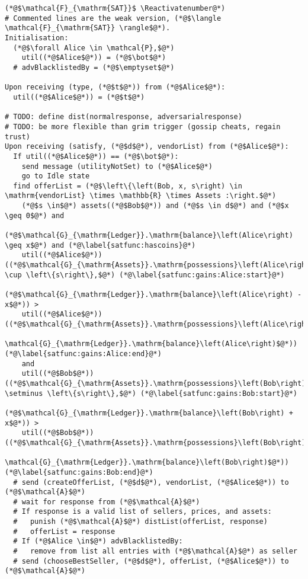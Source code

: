 \Suppressnumber
\begin{lstlisting}[label=satfunc, style=numbers]
(*@$\mathcal{F}_{\mathrm{SAT}}$ \Reactivatenumber@*)
# Commented lines are the weak version, (*@$\langle \mathcal{F}_{\mathrm{SAT}} \rangle$@*).
Initialisation:
  (*@$\forall Alice \in \mathcal{P},$@*)
    util((*@$Alice$@*)) = (*@$\bot$@*)
  # advBlacklistedBy = (*@$\emptyset$@*)

Upon receiving (type, (*@$t$@*)) from (*@$Alice$@*):
  util((*@$Alice$@*)) = (*@$t$@*)

# TODO: define dist(normalresponse, adversarialresponse)
# TODO: be more flexible than grim trigger (gossip cheats, regain trust)
Upon receiving (satisfy, (*@$d$@*), vendorList) from (*@$Alice$@*):
  If util((*@$Alice$@*)) == (*@$\bot$@*):
    send message (utilityNotSet) to (*@$Alice$@*)
    go to Idle state
  find offerList = (*@$\left\{\left(Bob, x, s\right) \in \mathrm{vendorList} \times \mathbb{R} \times Assets :\right.$@*)
    (*@$s \in$@*) assets((*@$Bob$@*)) and (*@$s \in d$@*) and (*@$x \geq 0$@*) and
    (*@$\mathcal{G}_{\mathrm{Ledger}}.\mathrm{balance}\left(Alice\right) \geq x$@*) and (*@\label{satfunc:hascoins}@*)
    util((*@$Alice$@*))((*@$\mathcal{G}_{\mathrm{Assets}}.\mathrm{possessions}\left(Alice\right) \cup \left\{s\right\},$@*) (*@\label{satfunc:gains:Alice:start}@*)
        (*@$\mathcal{G}_{\mathrm{Ledger}}.\mathrm{balance}\left(Alice\right) - x$@*)) >
    util((*@$Alice$@*))((*@$\mathcal{G}_{\mathrm{Assets}}.\mathrm{possessions}\left(Alice\right),
    \mathcal{G}_{\mathrm{Ledger}}.\mathrm{balance}\left(Alice\right)$@*)) (*@\label{satfunc:gains:Alice:end}@*)
    and
    util((*@$Bob$@*))((*@$\mathcal{G}_{\mathrm{Assets}}.\mathrm{possessions}\left(Bob\right) \setminus \left\{s\right\},$@*) (*@\label{satfunc:gains:Bob:start}@*)
        (*@$\mathcal{G}_{\mathrm{Ledger}}.\mathrm{balance}\left(Bob\right) + x$@*)) >
    util((*@$Bob$@*))((*@$\mathcal{G}_{\mathrm{Assets}}.\mathrm{possessions}\left(Bob\right),
    \mathcal{G}_{\mathrm{Ledger}}.\mathrm{balance}\left(Bob\right)$@*)) (*@\label{satfunc:gains:Bob:end}@*)
  # send (createOfferList, (*@$d$@*), vendorList, (*@$Alice$@*)) to (*@$\mathcal{A}$@*)
  # wait for response from (*@$\mathcal{A}$@*)
  # If response is a valid list of sellers, prices, and assets:
  #   punish (*@$\mathcal{A}$@*) distList(offerList, response)
  #   offerList = response
  # If (*@$Alice \in$@*) advBlacklistedBy:
  #   remove from list all entries with (*@$\mathcal{A}$@*) as seller
  # send (chooseBestSeller, (*@$d$@*), offerList, (*@$Alice$@*)) to (*@$\mathcal{A}$@*)

\end{lstlisting}
